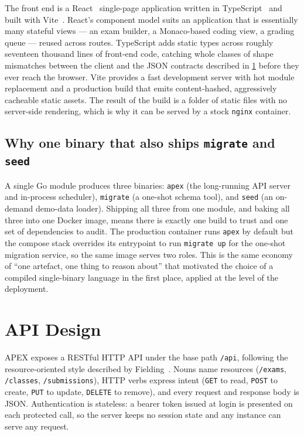 The front end is a React~\cite{react} single-page application written in
TypeScript~\cite{typescript} and built with Vite~\cite{vite}. React's
component model suits an application that is essentially many stateful views ---
an exam builder, a Monaco-based coding view, a grading queue --- reused across
routes. TypeScript adds static types across roughly seventeen thousand lines of
front-end code, catching whole classes of shape mismatches between the client
and the JSON contracts described in \cref{sec:api} before they ever reach the
browser. Vite provides a fast development server with hot module replacement and
a production build that emits content-hashed, aggressively cacheable static
assets. The result of the build is a folder of static files with no server-side
rendering, which is why it can be served by a stock \texttt{nginx} container.

\subsection{Why one binary that also ships \texttt{migrate} and \texttt{seed}}

A single Go module produces three binaries: \texttt{apex} (the long-running API
server and in-process scheduler), \texttt{migrate} (a one-shot schema tool), and
\texttt{seed} (an on-demand demo-data loader). Shipping all three from one
module, and baking all three into one Docker image, means there is exactly one
build to trust and one set of dependencies to audit. The production container
runs \texttt{apex} by default but the compose stack overrides its entrypoint to
run \texttt{migrate up} for the one-shot migration service, so the same image
serves two roles. This is the same economy of ``one artefact, one thing to
reason about'' that motivated the choice of a compiled single-binary language in
the first place, applied at the level of the deployment.

\section{API Design}\label{sec:api}

APEX exposes a RESTful HTTP API under the base path \texttt{/api}, following the
resource-oriented style described by Fielding~\cite{fielding2000rest}. Nouns
name resources (\texttt{/exams}, \texttt{/classes}, \texttt{/submissions}), HTTP
verbs express intent (\texttt{GET} to read, \texttt{POST} to create,
\texttt{PUT} to update, \texttt{DELETE} to remove), and every request and
response body is JSON. Authentication is stateless: a bearer token issued at
login is presented on each protected call, so the server keeps no session state
and any instance can serve any request.

